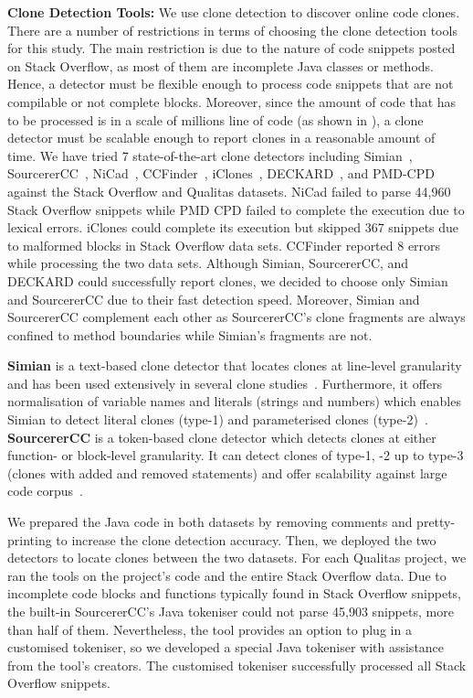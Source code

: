 \documentclass[10pt,journal,compsoc]{IEEEtran}
\begin{document}
\textbf{Clone Detection Tools: } We use clone detection to discover online code
clones. %
There are a number of restrictions in terms of choosing the clone detection
tools for this study. The main restriction is due to the nature of code snippets
posted on Stack Overflow, as most of them are incomplete Java classes or
methods. Hence, a detector must be flexible enough to process code snippets that
are not compilable or not complete blocks. Moreover, since the amount of code
that has to be processed is in a scale of millions line of code (as shown in
), a clone detector must be scalable enough to report clones
in a reasonable amount of time. We have tried 7 state-of-the-art clone detectors
including Simian~\cite{simian}, SourcererCC~\cite{Sajnani2016},
NiCad~\cite{Cordy,Roy2008}, CCFinder~\cite{Kamiya2002}, iClones~\cite{Gode2009},
DECKARD~\cite{Jiang2007a}, and PMD-CPD~\cite{pmd-cpd} against the Stack Overflow
and Qualitas datasets. NiCad failed to parse 44,960 Stack Overflow snippets
while PMD CPD failed to complete the execution due to lexical errors. iClones
could complete its execution but skipped 367 snippets due to malformed blocks in
Stack Overflow data sets. CCFinder reported 8 errors while processing the two data sets. 
Although Simian, SourcererCC, and DECKARD
could successfully report clones, we decided to choose only Simian and
SourcererCC due to their fast detection speed. Moreover, Simian and
SourcererCC complement each other as SourcererCC's clone fragments are
always confined to method boundaries while Simian's fragments are not.

\textbf{Simian} is a text-based clone detector that locates clones at line-level
granularity and has been used extensively in several clone
studies~\cite{Ragkhitwetsagul2016, emse, Wang2013, Mondal2011, Cheung2015,
	Krinke2010}. Furthermore, it offers normalisation of variable names and literals
(strings and numbers) which enables Simian to detect literal clones (type-1) and
parameterised clones (type-2)~\cite{Bellon2007}. \textbf{SourcererCC} is a token-based clone
detector which detects clones at either function- or block-level granularity. It
can detect clones of type-1, -2 up to type-3 (clones with added and removed
statements) and offer scalability against large code
corpus~\cite{Sajnani2016,Saini2016,Yang2017}. 

We prepared the Java code in both datasets by removing comments and
pretty-printing to increase the clone detection accuracy. Then, we deployed the
two detectors to locate clones between the two datasets.  For each Qualitas
project, we ran the tools on the project's code and the entire Stack Overflow
data. Due to incomplete code blocks and functions
typically found in Stack Overflow snippets, the built-in SourcererCC's Java
tokeniser could not parse 45,903 snippets, more than half of them. Nevertheless,
the tool provides an option to plug in a customised tokeniser, so we developed a
special Java tokeniser with assistance from the tool's creators. The customised
tokeniser successfully processed all Stack Overflow snippets.
\end{document}
